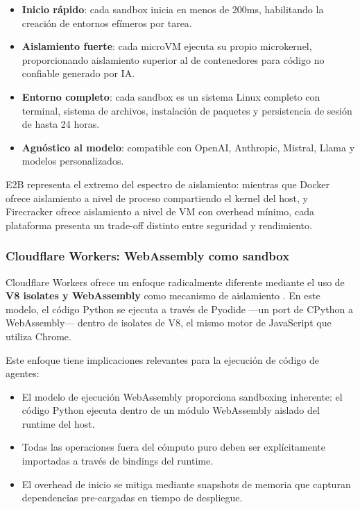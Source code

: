 \begin{itemize}
    \item \textbf{Inicio rápido}: cada sandbox inicia en menos de 200ms,
    habilitando la creación de entornos efímeros por tarea.
    \item \textbf{Aislamiento fuerte}: cada microVM ejecuta su propio
    microkernel, proporcionando aislamiento superior al de contenedores para
    código no confiable generado por IA.
    \item \textbf{Entorno completo}: cada sandbox es un sistema Linux completo
    con terminal, sistema de archivos, instalación de paquetes y persistencia
    de sesión de hasta 24 horas.
    \item \textbf{Agnóstico al modelo}: compatible con OpenAI, Anthropic,
    Mistral, Llama y modelos personalizados.
\end{itemize}

E2B representa el extremo del espectro de aislamiento: mientras que Docker
ofrece aislamiento a nivel de proceso compartiendo el kernel del host, y
Firecracker ofrece aislamiento a nivel de VM con overhead mínimo, cada
plataforma presenta un trade-off distinto entre seguridad y rendimiento.

\subsubsection{Cloudflare Workers: WebAssembly como sandbox}

Cloudflare Workers ofrece un enfoque radicalmente diferente mediante el uso de
\textbf{V8 isolates y WebAssembly} como mecanismo de aislamiento
\citep{cloudflare2024workers}. En este modelo, el código Python se ejecuta a
través de Pyodide ---un port de CPython a WebAssembly--- dentro de isolates de
V8, el mismo motor de JavaScript que utiliza Chrome.

Este enfoque tiene implicaciones relevantes para la ejecución de código de
agentes:

\begin{itemize}
    \item El modelo de ejecución WebAssembly proporciona sandboxing inherente:
    el código Python ejecuta dentro de un módulo WebAssembly aislado del
    runtime del host.
    \item Todas las operaciones fuera del cómputo puro deben ser explícitamente
    importadas a través de bindings del runtime.
    \item El overhead de inicio se mitiga mediante snapshots de memoria que
    capturan dependencias pre-cargadas en tiempo de despliegue.
\end{itemize}

